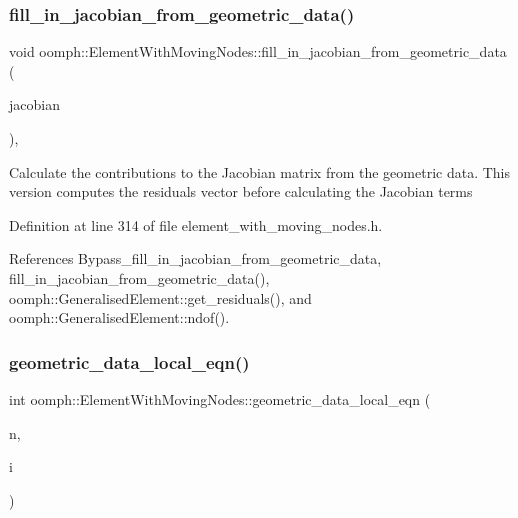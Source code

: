 \subsubsection{\texorpdfstring{fill\+\_\+in\+\_\+jacobian\+\_\+from\+\_\+geometric\+\_\+data()}{fill\_in\_jacobian\_from\_geometric\_data()}\hspace{0.1cm}{\footnotesize\ttfamily [2/2]}}
{\footnotesize\ttfamily void oomph\+::\+Element\+With\+Moving\+Nodes\+::fill\+\_\+in\+\_\+jacobian\+\_\+from\+\_\+geometric\+\_\+data (\begin{DoxyParamCaption}\item[{\hyperlink{classoomph_1_1DenseMatrix}{Dense\+Matrix}$<$ double $>$ \&}]{jacobian }\end{DoxyParamCaption})\hspace{0.3cm}{\ttfamily [inline]}, {\ttfamily [protected]}}

Calculate the contributions to the Jacobian matrix from the geometric data. This version computes the residuals vector before calculating the Jacobian terms 

Definition at line 314 of file element\+\_\+with\+\_\+moving\+\_\+nodes.\+h.



References Bypass\+\_\+fill\+\_\+in\+\_\+jacobian\+\_\+from\+\_\+geometric\+\_\+data, fill\+\_\+in\+\_\+jacobian\+\_\+from\+\_\+geometric\+\_\+data(), oomph\+::\+Generalised\+Element\+::get\+\_\+residuals(), and oomph\+::\+Generalised\+Element\+::ndof().

\mbox{\label{classoomph_1_1ElementWithMovingNodes_a2005bd9a0f38ad2eab3ec1250c8a7ba4}} 
\subsubsection{\texorpdfstring{geometric\+\_\+data\+\_\+local\+\_\+eqn()}{geometric\_data\_local\_eqn()}}
{\footnotesize\ttfamily int oomph\+::\+Element\+With\+Moving\+Nodes\+::geometric\+\_\+data\+\_\+local\+\_\+eqn (\begin{DoxyParamCaption}\item[{const unsigned \&}]{n,  }\item[{const unsigned \&}]{i }\end{DoxyParamCaption})\hspace{0.3cm}{\ttfamily [inline]}}



